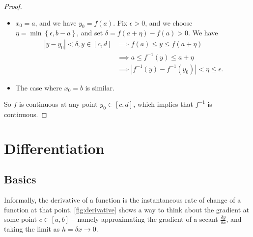 \documentclass[11pt]{article}
\numberwithin{equation}{section}
\theoremstyle{definition}
\theoremstyle{remark}
\newcommand{\pqty}[1]{\left(#1\right)}
\newcommand{\Bqty}[1]{\left\{#1\right\}}
\newcommand{\abs}[1]{\left|#1\right|}
\newcommand{\ccintv}[2]{[#1,#2]}
\newcommand{\inverse}{^{-1}}
\begin{document}
\begin{proof}
\begin{itemize}
        \item \(x_0 = a\), and we have \(y_0 = f\pqty{a}\). Fix \(\epsilon > 0\), and we choose \(\eta = \min\Bqty{\epsilon, b - a}\), and set \(\delta = f\pqty{a + \eta} - f\pqty{a} > 0\). We have
        \begin{align*}
            \abs{y - y_0} < \delta, y \in \ccintv{c}{d} &\implies f\pqty{a} \leq y \leq f\pqty{a + \eta} \\
            &\implies a \leq f\inverse\pqty{y} \leq a + \eta \\
            &\implies \abs{f\inverse\pqty{y} - f\inverse\pqty{y_0}} < \eta \leq \epsilon.
        \end{align*}

        \item The case where \(x_0 = b\) is similar.
    \end{itemize}

    So \(f\) is continuous at any point \(y_0 \in \ccintv{c}{d}\), which implies that \(f\inverse\) is continuous.
\end{proof}

\section{Differentiation}
\subsection{Basics}

Informally, the derivative of a function is the instantaneous rate of change of a function at that point. \autoref{fig:derivative} shows a way to think about the gradient at some point \(c \in \ccintv{a}{b}\) -- namely approximating the gradient of a secant \(\frac{\delta y}{\delta x}\), and taking the limit as \(h = \delta x \to 0\).
\end{document}
